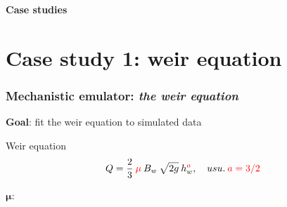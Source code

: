 \documentclass[xcolor=dvipsnames, USenglish]{beamer}  %
\begin{document}
  {
  \begin{frame}[plain]
    \centering
    \Large{\textbf{Case studies}}\\
  \end{frame}
  }


\section{Case study 1: weir equation}

  \begin{frame}
    \frametitle{Mechanistic emulator: \emph{the weir equation}}
    \textbf{Goal}: fit the weir equation to simulated data\\
    \vfill
    \begin{alertblock}{Weir equation}
      \setlength\abovedisplayskip{0pt}
      \begin{equation*}
        Q = \frac{2}{3}\: \textcolor{red}{\mu}\: B_w\: \sqrt{2g}\: h_w^{\textcolor{red}{a}},
        \quad usu.\: \textcolor{red}{a = 3/2}
      \end{equation*}
    \end{alertblock}
    \vfill
    \centering
    $\boldsymbol{\mu :\,}$ 
  \end{frame}
\end{document}
